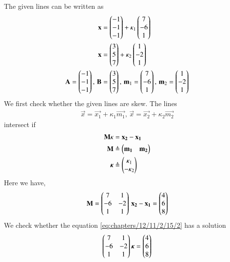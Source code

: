  The given lines  can be written as
\begin{align}
\mathbf{x} &= \begin{pmatrix}-1\\-1\\-1\end{pmatrix} + \kappa_1\begin{pmatrix}7\\-6\\1\end{pmatrix}\\
\mathbf{x} &= \begin{pmatrix}3\\5\\7\end{pmatrix} + \kappa_2\begin{pmatrix}1\\-2\\1\end{pmatrix} \\
\mathbf{A} = \begin{pmatrix}-1\\-1\\-1\end{pmatrix},\, \mathbf{B} &= \begin{pmatrix}3\\5\\7\end{pmatrix}, \,\mathbf{m}_1 = \begin{pmatrix}7\\-6\\1\end{pmatrix}, \, \mathbf{m}_2 = \begin{pmatrix}1\\-2\\1\end{pmatrix}
\end{align}
%
We first check whether the given lines are skew. The lines 
\begin{align}
\vec{x} = \vec{x_1} + \kappa_1\vec{m_1},\, \vec{x} = \vec{x_2} + \kappa_2\vec{m_2} 
\label{eq:chapters/12/11/2/15/1}
\end{align}
intersect if
\begin{align}
\mathbf{M}{\kappa} &= \mathbf{x_2} - \mathbf{x_1}\\
\mathbf{M} &\triangleq \begin{pmatrix}\mathbf{m_1} & \mathbf{m_2}\end{pmatrix} \\
\bm{\kappa} &\triangleq \begin{pmatrix}\kappa_1\\-\kappa_2\end{pmatrix}\\
\end{align}
Here we have,
\begin{align}
\mathbf{M} = \begin{pmatrix}7&1\\-6&-2\\1&1\end{pmatrix}\,
\mathbf{x_2} - \mathbf{x_1} = \begin{pmatrix}4\\6\\8\end{pmatrix}
\end{align}
We check whether the equation \eqref{eq:chapters/12/11/2/15/2} has a solution
\begin{align}
\begin{pmatrix}7&1\\-6&-2\\1&1\end{pmatrix}\bm{\kappa} = \begin{pmatrix}4\\6\\8\end{pmatrix}
\label{eq:chapters/12/11/2/15/2}
\end{align}
